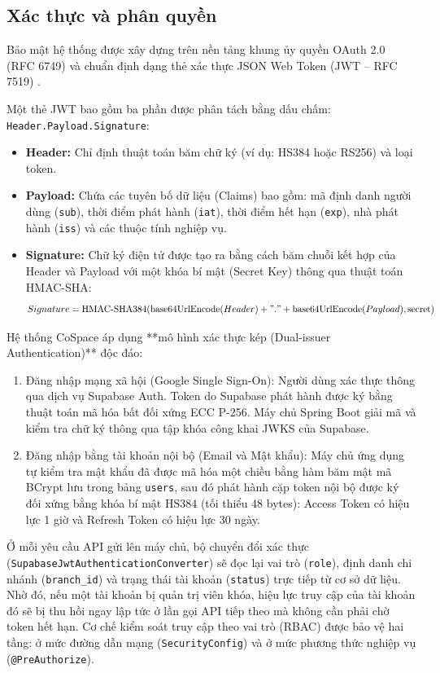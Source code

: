 \subsection{Xác thực và phân quyền}
Bảo mật hệ thống được xây dựng trên nền tảng khung ủy quyền OAuth 2.0 (RFC 6749) \cite{rfc6749} và chuẩn định dạng thẻ xác thực JSON Web Token (JWT -- RFC 7519) \cite{rfc7519}.

Một thẻ JWT bao gồm ba phần được phân tách bằng dấu chấm: \texttt{Header.Payload.Signature}:
\begin{itemize}
    \item \textbf{Header:} Chỉ định thuật toán băm chữ ký (ví dụ: HS384 hoặc RS256) và loại token.
    \item \textbf{Payload:} Chứa các tuyên bố dữ liệu (Claims) bao gồm: mã định danh người dùng (\texttt{sub}), thời điểm phát hành (\texttt{iat}), thời điểm hết hạn (\texttt{exp}), nhà phát hành (\texttt{iss}) và các thuộc tính nghiệp vụ.
    \item \textbf{Signature:} Chữ ký điện tử được tạo ra bằng cách băm chuỗi kết hợp của Header và Payload với một khóa bí mật (Secret Key) thông qua thuật toán HMAC-SHA:
    \begin{equation}
        Signature = \text{HMAC-SHA384}(\text{base64UrlEncode}(Header) + "." + \text{base64UrlEncode}(Payload), \text{secret})
        \label{eq:jwt}
    \end{equation}
\end{itemize}

Hệ thống CoSpace áp dụng **mô hình xác thực kép (Dual-issuer Authentication)** độc đáo:
\begin{enumerate}
    \item Đăng nhập mạng xã hội (Google Single Sign-On): Người dùng xác thực thông qua dịch vụ Supabase Auth. Token do Supabase phát hành được ký bằng thuật toán mã hóa bất đối xứng ECC P-256. Máy chủ Spring Boot giải mã và kiểm tra chữ ký thông qua tập khóa công khai JWKS của Supabase.
    \item Đăng nhập bằng tài khoản nội bộ (Email và Mật khẩu): Máy chủ ứng dụng tự kiểm tra mật khẩu đã được mã hóa một chiều bằng hàm băm mật mã BCrypt lưu trong bảng \texttt{users}, sau đó phát hành cặp token nội bộ được ký đối xứng bằng khóa bí mật HS384 (tối thiểu 48 bytes): Access Token có hiệu lực 1 giờ và Refresh Token có hiệu lực 30 ngày.
\end{enumerate}

Ở mỗi yêu cầu API gửi lên máy chủ, bộ chuyển đổi xác thực (\texttt{SupabaseJwtAuthenticationConverter}) sẽ đọc lại vai trò (\texttt{role}), định danh chi nhánh (\texttt{branch\_id}) và trạng thái tài khoản (\texttt{status}) trực tiếp từ cơ sở dữ liệu. Nhờ đó, nếu một tài khoản bị quản trị viên khóa, hiệu lực truy cập của tài khoản đó sẽ bị thu hồi ngay lập tức ở lần gọi API tiếp theo mà không cần phải chờ token hết hạn. Cơ chế kiểm soát truy cập theo vai trò (RBAC) được bảo vệ hai tầng: ở mức đường dẫn mạng (\texttt{SecurityConfig}) và ở mức phương thức nghiệp vụ (\texttt{@PreAuthorize}).

